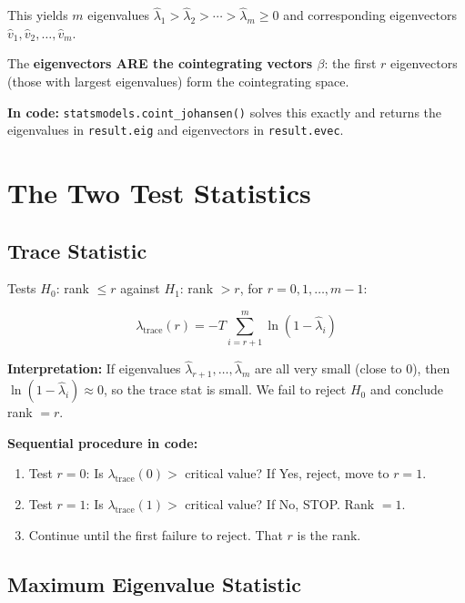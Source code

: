 \documentclass[12pt, a4paper]{article}
\begin{document}
This yields $m$ eigenvalues $\hat{\lambda}_1 > \hat{\lambda}_2 > \cdots > \hat{\lambda}_m \geq 0$ 
and corresponding eigenvectors $\hat{v}_1, \hat{v}_2, \ldots, \hat{v}_m$.

The \textbf{eigenvectors ARE the cointegrating vectors $\beta$}: the first $r$ eigenvectors 
(those with largest eigenvalues) form the cointegrating space.

\textbf{In code:} \texttt{statsmodels.coint\_johansen()} solves this exactly and returns the 
eigenvalues in \texttt{result.eig} and eigenvectors in \texttt{result.evec}.

\section{The Two Test Statistics}

\subsection{Trace Statistic}

Tests $H_0$: rank $\leq r$ against $H_1$: rank $> r$, for $r = 0, 1, \ldots, m-1$:

\begin{equation}
    \boxed{ \lambda_{\text{trace}}(r) = -T \sum_{i=r+1}^{m} \ln(1 - \hat{\lambda}_i) }
    \label{eq:trace}
\end{equation}

\textbf{Interpretation:} If eigenvalues $\hat{\lambda}_{r+1}, \ldots, \hat{\lambda}_m$ are all very 
small (close to 0), then $\ln(1-\hat{\lambda}_i) \approx 0$, so the trace stat is small. 
We fail to reject $H_0$ and conclude rank $= r$.

\textbf{Sequential procedure in code:}
\begin{enumerate}
    \item Test $r = 0$: Is $\lambda_{\text{trace}}(0) >$ critical value? If Yes, reject, move to $r=1$.
    \item Test $r = 1$: Is $\lambda_{\text{trace}}(1) >$ critical value? If No, STOP. Rank $= 1$.
    \item Continue until the first failure to reject. That $r$ is the rank.
\end{enumerate}

\subsection{Maximum Eigenvalue Statistic}
\end{document}
